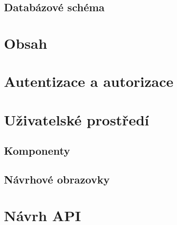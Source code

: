 \subsection{Databázové schéma}

\section{Obsah}\label{text:navrh/obsah}

\section{Autentizace a autorizace}\label{text:navrh/auth}

\section{Uživatelské prostředí}

\subsection{Komponenty}

\subsection{Návrhové obrazovky}

\section{Návrh API}
